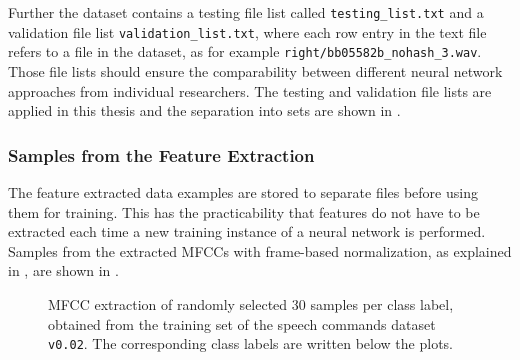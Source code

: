 Further the dataset contains a testing file list called \texttt{testing\_list.txt} and a validation file list \texttt{validation\_list.txt}, where each row entry in the text file refers to a file in the dataset, as for example \texttt{right/bb05582b\_nohash\_3.wav}.
Those file lists should ensure the comparability between different neural network approaches from individual researchers.
The testing and validation file lists are applied in this thesis and the separation into sets are shown in .



\subsubsection{Samples from the Feature Extraction}
The feature extracted data examples are stored to separate files before using them for training.
This has the practicability that features do not have to be extracted each time a new training instance of a neural network is performed.
Samples from the extracted MFCCs with frame-based normalization, as explained in , are shown in .
\begin{figure}[!ht]
  \centering
  \caption{MFCC extraction of randomly selected 30 samples per class label, obtained from the training set of the speech commands dataset \texttt{v0.02}. The corresponding class labels are written below the plots.}
  \label{fig:exp_dataset_speech_cmd_mfcc}
\end{figure}
